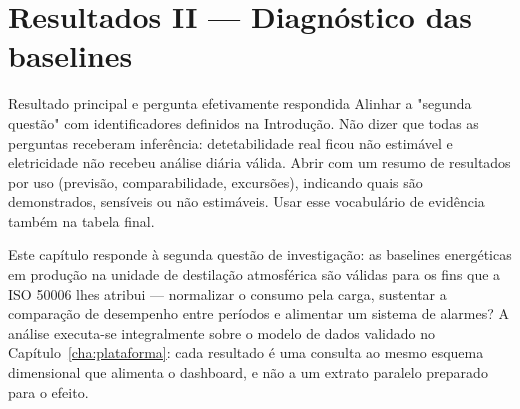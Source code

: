
\chapter{Resultados II --- Diagnóstico das baselines}
\label{cha:diagnostico}
{Resultado principal e pergunta efetivamente respondida}
{Alinhar a "segunda questão" com identificadores definidos na Introdução.
Não dizer que todas as perguntas receberam inferência: detetabilidade real
ficou não estimável e eletricidade não recebeu análise diária válida.
Abrir com um resumo de resultados por uso (previsão, comparabilidade,
excursões), indicando quais são demonstrados, sensíveis ou não estimáveis.
Usar esse vocabulário de evidência também na tabela final.}%

Este capítulo responde à segunda questão de investigação: as baselines
energéticas em produção na unidade de destilação atmosférica são válidas para
os fins que a ISO 50006 lhes atribui --- normalizar o consumo pela carga,
sustentar a comparação de desempenho entre períodos e alimentar um sistema de
alarmes? A análise executa-se integralmente sobre o modelo de dados
validado no Capítulo~\ref{cha:plataforma}: cada resultado é uma consulta ao
mesmo esquema dimensional que alimenta o dashboard, e não a um extrato
paralelo preparado para o efeito.

